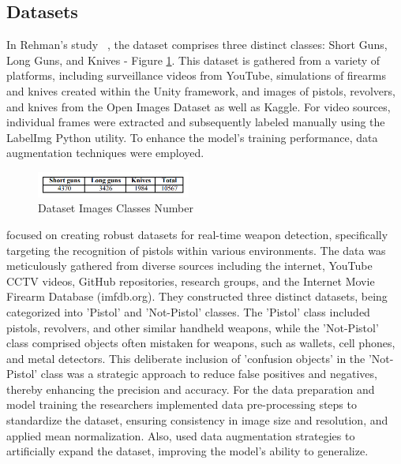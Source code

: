 \subsection{Datasets}
In Rehman's study ~\cite{rfc3}, the dataset comprises three distinct classes: Short Guns, Long Guns, and Knives - Figure \ref{fig:rehman-dataset}. This dataset is gathered from a variety of platforms, including surveillance videos from YouTube, simulations of firearms and knives created within the Unity framework, and images of pistols, revolvers, and knives from the Open Images Dataset as well as Kaggle. For video sources, individual frames were extracted and subsequently labeled manually using the LabelImg Python utility. To enhance the model's training performance, data augmentation techniques were employed.

\begin{figure}[h]
    \centering 
    \includegraphics[width=0.45\textwidth]{figs/rheman-dataset.png} 
    \caption{\citet{rfc3} Dataset Images Classes Number}
    \label{fig:rehman-dataset}
\end{figure}

\citet{rfc4} focused on creating robust datasets for real-time weapon detection, specifically targeting the recognition of pistols within various environments. The data was meticulously gathered from diverse sources including the internet, YouTube CCTV videos, GitHub repositories, research groups, and the Internet Movie Firearm Database (imfdb.org).
They constructed three distinct datasets, being categorized into 'Pistol' and 'Not-Pistol' classes. The 'Pistol' class included pistols, revolvers, and other similar handheld weapons, while the 'Not-Pistol' class comprised objects often mistaken for weapons, such as wallets, cell phones, and metal detectors. This deliberate inclusion of 'confusion objects' in the 'Not-Pistol' class was a strategic approach to reduce false positives and negatives, thereby enhancing the precision and accuracy. For the data preparation and model training the researchers implemented data pre-processing steps to standardize the dataset, ensuring consistency in image size and resolution, and applied mean normalization. Also, used data augmentation strategies to artificially expand the dataset, improving the model's ability to generalize.

